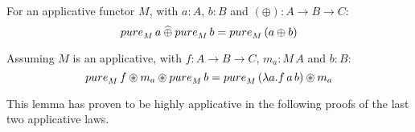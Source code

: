 
\begin{lemma}\label{lemma:pure_lift}
For an applicative functor $M$, with $a:A$, $b:B$ and $(\oplus) : A \rightarrow B \rightarrow C$:
$$
\apure_M\, a \alift{\oplus} \apure_M\, b = \apure_M\, (a \oplus b)
$$
\end{lemma}

\begin{lemma}\label{lemma:applicative_flip}
Assuming $M$ is an applicative, with $f : A \rightarrow B \rightarrow C$, $m_a : M\, A$ and $b : B$:
$$
\apure_M\, f \appl m_a \appl \apure_M\, b = \apure_M\, (\lambda a . f\, a\, b) \appl m_a
$$
\end{lemma}
This lemma has proven to be highly applicative in the following proofs of the last two applicative laws.

